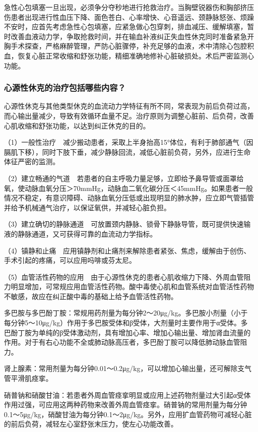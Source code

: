 急性心包填塞一旦出现，必须争分夺秒地进行抢救治疗。当胸壁锐器伤和胸部挤压伤患者出现进行性血压下降、面色苍白、心率增快、心音遥远、颈静脉怒张、烦躁不安时，应首先考虑急性心包填塞，应紧急做心包穿刺，排血减压、缓解填塞，暂时改善血液动力学，争取抢救时间，并在输血补液纠正失血性休克同时准备紧急开胸手术探查，严格麻醉管理，严防心脏骤停，补充足够的血液，术中清除心包腔积血，恢复心脏正常收缩和舒张功能，精细准确地修补心脏破损处。术后严密监测心功能。

\subsubsection{心源性休克的治疗包括哪些内容？}

心源性休克与其他类型休克的血流动力学特征有所不同，常表现为前后负荷过高，而心输出量减少，导致有效循环血量不足。治疗原则为调整心脏前、后负荷，改善心肌收缩和舒张功能，以达到纠正休克的目的。

（1）一般性治疗　减少搬动患者，采取上半身抬高15°体位，有利于肺部通气（因膈肌下移），同时下肢下垂，减少静脉回流，减低心脏前负荷，另外，应进行生命体征严密的监测。

（2）建立畅通的气道　若患者的自主呼吸力量足够，立即给予鼻导管或面罩给氧，使动脉血氧分压＞70mmHg，动脉血二氧化碳分压＜45mmHg。如果患者一般情况不稳定，有意识障碍、动脉血氧分压低或出现明显的肺水肿，应立即气管插管并给予机械通气治疗，以保证氧供，并减轻心脏负担。

（3）建立确切的静脉通道　可放置颈内静脉、锁骨下静脉导管，既可提供快速输液的静脉通道，又可获得可靠的血流动力学指标。

（4）镇静和止痛　应用镇静剂和止痛剂来解除患者紧张、焦虑，缓解由于创伤、手术引起的疼痛，可以应用吗啡或芬太尼。

（5）血管活性药物的应用　由于心源性休克的患者心肌收缩力下降、外周血管阻力明显增加，可常规应用血管活性药物。酸中毒使心肌和血管系统对血管活性药物不敏感，故应在纠正酸中毒的基础上给予血管活性药物。

多巴胺与多巴酚丁胺：常规用药剂量为每分钟2～20μg/kg。多巴胺小剂量（小于每分钟5～10μg/kg）作用于多巴胺受体和β受体，大剂量时主要作用于α受体。多巴酚丁胺为单纯的β受体激动剂，具有增加心率、增加心输出量、增加肾血流量的作用。对于有右心功能不全或肺动脉高压者，多巴酚丁胺可以降低肺动脉血管阻力。

肾上腺素：常用剂量为每分钟0.01～0.2μg/kg，可以增加心输出量，还可解除支气管平滑肌痉挛。

硝普钠和硝酸甘油：若患者外周血管痉挛明显或应用上述药物剂量过大引起α受体作用过强，可应用这两种药物来改善外周血管痉挛。硝普钠的常用剂量为每分钟0.1～5μg/kg，硝酸甘油为每分钟0.1～2μg/kg。另外，应用扩血管药物可减轻心脏的前后负荷，减轻左心室舒张末压力，使左心功能改善。

